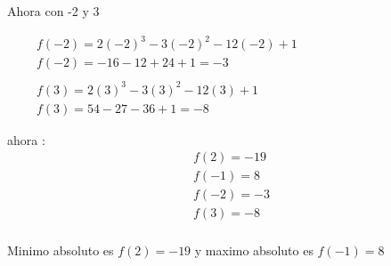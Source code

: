 \documentclass{report}
\begin{document}
{\vspace{2cm}
Ahora con -2 y 3

\begin{align*}
     & f(-2) = 2(-2)^3 -3(-2)^2 -12(-2) + 1 &  &  &  &  &  &  &  &  &  &  &  &  &  & \\
     & f(-2) = -16 -12 +24 +1 = -3                                                   \\\\
     & f(3) = 2(3)^3 -3(3)^2 -12(3) + 1                                              \\
     & f(3) = 54 - 27 -36 + 1 = -8
\end{align*}

ahora :\\

\begin{align*}
       f(2) = -19 \\
       f(-1) = 8\\
       f(-2) = -3\\
       f(3) = -8 \\
\end{align*}


Minimo absoluto es $ f(2) = -19 $ y maximo absoluto es $f(-1) = 8 $
}
\vspace{20cm}
\end{document}
